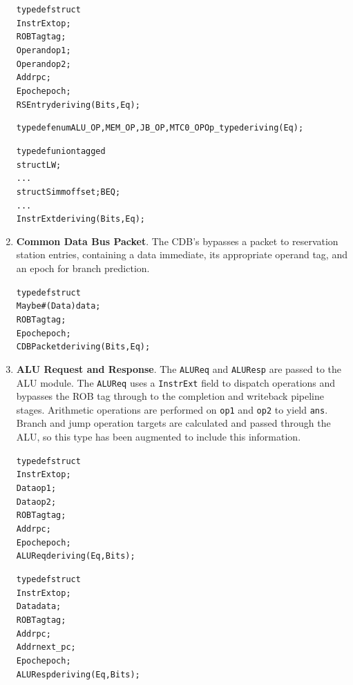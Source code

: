 \documentclass[12pt]{article}
\begin{document}
\begin{enumerate}
\begin{alltt}
        typedef struct {
                InstrExt op;
                ROBTag tag;
                Operand op1;
                Operand op2;
                Addr pc;
                Epoch epoch;
        } RSEntry deriving (Bits, Eq);
        
        typedef enum {ALU_OP, MEM_OP, JB_OP, MTC0_OP} Op_type deriving(Eq);    
        
        typedef union tagged {
            struct {} LW;
            ...
            struct { Simm offset;  } BEQ;
            ...
        } InstrExt deriving (Bits, Eq);
    \end{alltt}
    \item \textbf{Common Data Bus Packet}. The CDB's bypasses a packet to reservation station entries, containing a data
immediate, its appropriate operand tag, and an epoch for branch prediction.
    \begin{alltt}
        typedef struct {
            Maybe#(Data) data;
            ROBTag tag;
            Epoch epoch;
        } CDBPacket deriving (Bits, Eq);
    \end{alltt}
    \item \textbf{ALU Request and Response}. The \verb=ALUReq= and \verb=ALUResp= are passed to the ALU module. The
\verb=ALUReq= uses a \verb=InstrExt= field to dispatch operations and bypasses
the ROB tag through to the completion and writeback pipeline stages.
Arithmetic operations are performed on \verb=op1= and \verb=op2= to yield
\verb=ans=. Branch and jump operation targets are calculated and passed through the ALU, so this type has been augmented to include this information. 
    \begin{alltt}
        typedef struct {
            InstrExt  op;
            Data      op1;
            Data      op2;
            ROBTag    tag;
            Addr      pc;
            Epoch     epoch;
        } ALUReq deriving (Eq, Bits);

        typedef struct {
            InstrExt  op;
            Data   data;
            ROBTag tag;
            Addr   pc;
            Addr   next_pc;
            Epoch  epoch;
        } ALUResp deriving(Eq,Bits);
    \end{alltt}
\end{enumerate}
\end{document}
